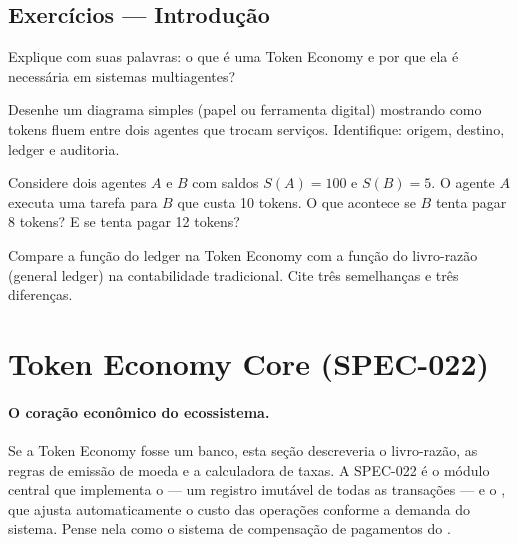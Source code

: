\subsection{Exercícios — Introdução}

\begin{exercicio}[Nivel 0]
Explique com suas palavras: o que é uma Token Economy e por que
ela é necessária em sistemas multiagentes?
\end{exercicio}

\begin{exercicio}
Desenhe um diagrama simples (papel ou ferramenta digital)
mostrando como tokens fluem entre dois agentes que trocam serviços.
Identifique: origem, destino, ledger e auditoria.
\end{exercicio}

\begin{exercicio}
Considere dois agentes $A$ e $B$ com saldos $S(A)=100$ e
$S(B)=5$. O agente $A$ executa uma tarefa para $B$ que custa
10 tokens. O que acontece se $B$ tenta pagar 8 tokens? E se
tenta pagar 12 tokens?
\end{exercicio}

\begin{exercicio}
Compare a função do ledger na Token Economy com a função do
livro-razão (general ledger) na contabilidade tradicional.
Cite três semelhanças e três diferenças.
\end{exercicio}

\section{Token Economy Core (SPEC-022)}
\label{sec:token-economy-core}
\nivelintermediario

\paragraph{O coração econômico do ecossistema.} Se a Token Economy fosse um banco, esta seção descreveria o livro-razão, as regras de emissão de moeda e a calculadora de taxas. A SPEC-022 é o módulo central que implementa o  --- um registro imutável de todas as transações --- e o , que ajusta automaticamente o custo das operações conforme a demanda do sistema. Pense nela como o sistema de compensação de pagamentos do \opencodeeco{}.


